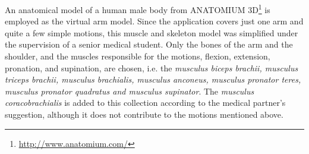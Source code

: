 An anatomical model of a human male body from ANATOMIUM 3D\footnote{\url{http://www.anatomium.com/}} is employed as the virtual arm model.
Since the application covers just one arm and quite a few simple motions, this muscle and skeleton model was simplified under the supervision of a senior medical student. Only the bones of the arm and the shoulder, and the muscles responsible for the motions, flexion, extension, pronation, and supination, are chosen, i.e. the \textit{musculus biceps brachii, musculus triceps brachii, musculus brachialis, musculus anconeus, musculus pronator teres, musculus pronator quadratus and musculus supinator}. The \textit{musculus coracobrachialis} is added to this collection according to the medical partner's suggestion, although it does not contribute to the motions mentioned above.

